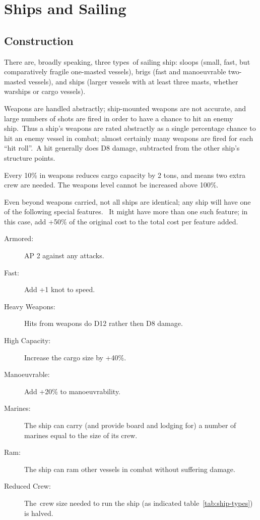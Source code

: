 \section{Ships and Sailing}

\subsection{Construction}
There are, broadly speaking, three types of sailing ship: sloops (small, fast, but comparatively fragile one-masted vessels), brigs (fast and manoeuvrable two-masted vessels), and ships (larger vessels with at least three masts, whether warships or cargo vessels).

Weapons are handled abstractly; ship-mounted weapons are not accurate, and large numbers of shots are fired in order to have a chance to hit an enemy ship. Thus a ship’s weapons are rated abstractly as a single percentage chance to hit an enemy vessel in combat; almost certainly many weapons are fired for each “hit roll”. A hit generally does D8 damage, subtracted from the other ship’s structure points.

Every 10\% in weapons reduces cargo capacity by 2 tons, and means two extra crew are needed. The weapons level cannot be increased above 100\%.

Even beyond weapons carried, not all ships are identical; any ship will have one of the following special features.  It might have more than one such feature; in this case, add +50\% of the original cost to the total cost per feature added.

\begin{description}
\item[Armored:] AP 2 against any attacks.
\item[Fast:] Add +1 knot to speed.
\item[Heavy Weapons:] Hits from weapons do D12 rather then D8 damage.
\item[High Capacity:] Increase the cargo size by +40\%.
\item[Manoeuvrable:] Add +20\% to manoeuvrability.
\item[Marines:] The ship can carry (and provide board and lodging for) a number of marines equal to the size of its crew.
\item[Ram:] The ship can ram other vessels in combat without suffering damage.
\item[Reduced Crew:] The crew size needed to run the ship (as indicated table~\ref{tab:ship-types}) is halved.
\end{description}

